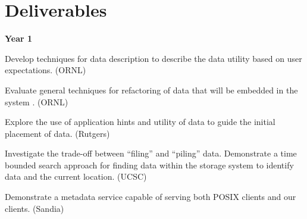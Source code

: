 \section{Deliverables}
\small

\textbf{Year 1}
\begin{tightItemize}
\item Develop  techniques for data description  to 
describe the data utility based on user expectations. (ORNL)

\item Evaluate general  techniques for refactoring of data
that will be embedded in the system . (ORNL)
\item Explore the use of application hints and utility of data to guide the initial placement of data. 
(Rutgers)
\item Investigate the trade-off between ``filing'' and ``piling'' data. 
Demonstrate a time bounded search approach for finding data within the storage system
to identify data and the current location. (UCSC)
\item Demonstrate a metadata service capable of serving both POSIX clients and our clients. (Sandia)
\end{tightItemize}

